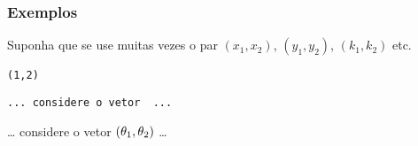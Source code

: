 \begin{frame}
  \frametitle{Exemplos}

  \begin{exemplo}
    Suponha que se use muitas vezes o par $(x_1,x_2)$, $(y_1,y_2)$,
    $(k_1,k_2)$ etc.
    \medskip 

    \texttt{\blue{\string\newcommand}\ac{}\green{\string\V}\fc\red{[1]}\ac{}{(\us{}1,\us{}2})\fc{}}\medskip

    
    \bigskip

    \texttt{...\ considere o vetor \dolar{}\green{\string\V}\purple{\ac\string\theta\fc}\dolar{}\
       ...}\smallskip

    
     \dots{} considere o vetor $\V{\theta}$ \dots
  \end{exemplo}
\end{frame}






